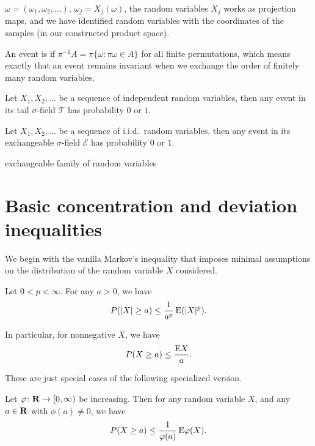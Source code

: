 $\omega = (\omega_1,\omega_2,\dotsc)$, $\omega_j = X_j(\omega)$, the random variables $X_j$ works as projection maps, and we have identified random variables with the coordinates of the samples (in our constructed product space).

An event is  if $\pi^{-1}A = \pi\{\omega:\pi \omega \in A\}$ for all finite permutations, which means exactly that an event remains invariant when we exchange the order of finitely many random variables.

\begin{namedthm} \label{thm:K-01-law}
    Let $X_1,X_2,\dotsc$ be a sequence of independent random variables, then any event in its tail $\sigma$-field $\mathcal T$ has probability $0$ or $1$.
\end{namedthm}

\begin{namedthm} \label{thm:HS-01-law}
    Let $X_1,X_2,\dotsc$ be a sequence of i.i.d.\ random variables, then any event in its exchangeable $\sigma$-field $\mathcal E$ has probability $0$ or $1$.
\end{namedthm}


exchangeable family of random variables

\begin{prop}
    
\end{prop}

\section{Basic concentration and deviation inequalities}
We begin with the vanilla Markov's inequality that imposes minimal assumptions on the distribution of the random variable $X$ considered.
\begin{namedthm} \label{thm:Markov-ineq-prob}
    Let $0< p < \infty$. For any $a > 0$, we have \[
        P(\lvert X \rvert \geq a) \leq \frac{1}{a^p} \mathop{}\!\mathrm{E}(\lvert X \rvert^p).
    \]

    In particular, for nonnegative $X$, we have \[
        P(X \geq a) \leq \frac{\mathop{}\!\mathrm{E} X}{a}.
    \]
\end{namedthm}

These are just special cases of the following specialized version.

\begin{namedthm}
    Let $\varphi\colon \mathbf{R} \to [0,\infty)$ be increasing. Then for any random variable $X$, and any $a\in \mathbf{R}$ with $\phi(a)\neq 0$, we have \[
        P(X \geq a) \leq \frac{1}{\varphi(a)}\mathop{}\!\mathrm{E} \varphi(X).
    \]
\end{namedthm}

